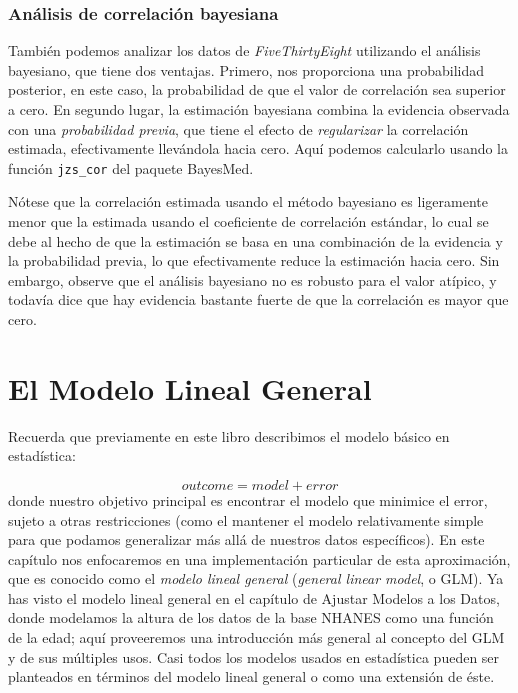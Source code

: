 \documentclass[
  12pt,
]{book}
\begin{document}
\hypertarget{anuxe1lisis-de-correlaciuxf3n-bayesiana}{%
\subsection{Análisis de correlación bayesiana}\label{anuxe1lisis-de-correlaciuxf3n-bayesiana}}

También podemos analizar los datos de \emph{FiveThirtyEight} utilizando el análisis bayesiano, que tiene dos ventajas. Primero, nos proporciona una probabilidad posterior, en este caso, la probabilidad de que el valor de correlación sea superior a cero. En segundo lugar, la estimación bayesiana combina la evidencia observada con una \emph{probabilidad previa}, que tiene el efecto de \emph{regularizar} la correlación estimada, efectivamente llevándola hacia cero. Aquí podemos calcularlo usando la función \texttt{jzs\_cor} del paquete BayesMed.

Nótese que la correlación estimada usando el método bayesiano es ligeramente menor que la estimada usando el coeficiente de correlación estándar, lo cual se debe al hecho de que la estimación se basa en una combinación de la evidencia y la probabilidad previa, lo que efectivamente reduce la estimación hacia cero. Sin embargo, observe que el análisis bayesiano no es robusto para el valor atípico, y todavía dice que hay evidencia bastante fuerte de que la correlación es mayor que cero.

\hypertarget{el-modelo-lineal-general}{%
\chapter{El Modelo Lineal General}\label{el-modelo-lineal-general}}

Recuerda que previamente en este libro describimos el modelo básico en estadística:

\[
outcome = model + error
\]
donde nuestro objetivo principal es encontrar el modelo que minimice el error, sujeto a otras restricciones (como el mantener el modelo relativamente simple para que podamos generalizar más allá de nuestros datos específicos). En este capítulo nos enfocaremos en una implementación particular de esta aproximación, que es conocido como el \emph{modelo lineal general} (\emph{general linear model}, o GLM). Ya has visto el modelo lineal general en el capítulo de Ajustar Modelos a los Datos, donde modelamos la altura de los datos de la base NHANES como una función de la edad; aquí proveeremos una introducción más general al concepto del GLM y de sus múltiples usos. Casi todos los modelos usados en estadística pueden ser planteados en términos del modelo lineal general o como una extensión de éste.
\end{document}
